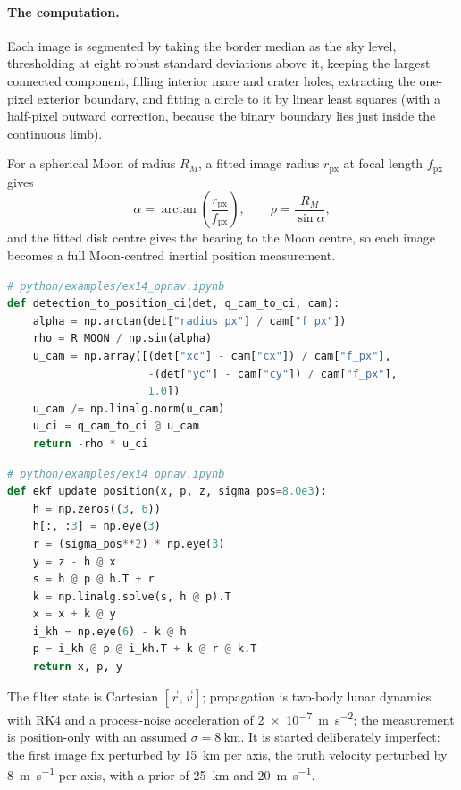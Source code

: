 \paragraph{The computation.}
Each image is segmented by taking the border median as the sky level, thresholding
at eight robust standard deviations above it, keeping the largest connected
component, filling interior mare and crater holes, extracting the one-pixel
exterior boundary, and fitting a circle to it by linear least squares (with a
half-pixel outward correction, because the binary boundary lies just inside the
continuous limb).

For a spherical Moon of radius $R_M$, a fitted image radius $r_\mathrm{px}$ at
focal length $f_\mathrm{px}$ gives
\begin{equation}
  \alpha = \arctan\!\left(\frac{r_\mathrm{px}}{f_\mathrm{px}}\right),
  \qquad
  \rho = \frac{R_M}{\sin\alpha},
  \label{eq:tut-opnav}
\end{equation}
and the fitted disk centre gives the bearing to the Moon centre, so each image
becomes a full Moon-centred inertial position measurement.

\begin{lstlisting}[language=py, caption={From a fitted limb circle to a Moon-centred position fix.}, label={lst:tut-ex14-meas}]
# python/examples/ex14_opnav.ipynb
def detection_to_position_ci(det, q_cam_to_ci, cam):
    alpha = np.arctan(det["radius_px"] / cam["f_px"])
    rho = R_MOON / np.sin(alpha)
    u_cam = np.array([(det["xc"] - cam["cx"]) / cam["f_px"],
                      -(det["yc"] - cam["cy"]) / cam["f_px"],
                      1.0])
    u_cam /= np.linalg.norm(u_cam)
    u_ci = q_cam_to_ci @ u_cam
    return -rho * u_ci
\end{lstlisting}

\begin{lstlisting}[language=py, caption={The position-only EKF measurement update.}, label={lst:tut-ex14-ekf}]
# python/examples/ex14_opnav.ipynb
def ekf_update_position(x, p, z, sigma_pos=8.0e3):
    h = np.zeros((3, 6))
    h[:, :3] = np.eye(3)
    r = (sigma_pos**2) * np.eye(3)
    y = z - h @ x
    s = h @ p @ h.T + r
    k = np.linalg.solve(s, h @ p).T
    x = x + k @ y
    i_kh = np.eye(6) - k @ h
    p = i_kh @ p @ i_kh.T + k @ r @ k.T
    return x, p, y
\end{lstlisting}

The filter state is Cartesian $[\vec{r},\vec{v}]$; propagation is two-body lunar
dynamics with RK4 and a process-noise acceleration of
\SI{2e-7}{\meter\per\second\squared}; the measurement is position-only with an
assumed $\sigma=\SI{8}{\kilo\meter}$. It is started deliberately imperfect:
the first image fix perturbed by \SI{15}{\kilo\meter} per axis, the truth
velocity perturbed by \SI{8}{\meter\per\second} per axis, with a prior of
\SI{25}{\kilo\meter} and \SI{20}{\meter\per\second}.

